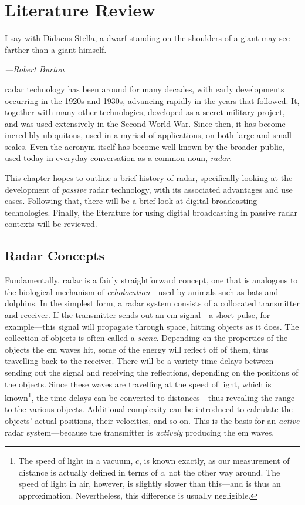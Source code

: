 \documentclass[class=report,11pt,crop=false]{standalone}
\begin{document}
\ifstandalone
\tableofcontents
\fi
\chapter{Literature Review}
\epigraph{I say with Didacus Stella, a dwarf standing on the shoulders of a giant may see farther than a giant himself.}%
    {\emph{---Robert Burton}}

\gls{radar} technology has been around for many decades, with early developments occurring in the 1920s and 1930s, advancing rapidly in the years that followed. It, together with many other technologies, developed as a secret military project, and was used extensively in the Second World War. Since then, it has become incredibly ubiquitous, used in a myriad of applications, on both large and small scales. Even the acronym itself has become well-known by the broader public, used today in everyday conversation as a common noun, \emph{radar}.

This chapter hopes to outline a brief history of radar, specifically looking at the development of \emph{passive} radar technology, with its associated advantages and use cases. Following that, there will be a brief look at digital broadcasting technologies. Finally, the literature for using digital broadcasting in passive radar contexts will be reviewed.

\section{Radar Concepts}

Fundamentally, radar is a fairly straightforward concept, one that is analogous to the biological mechanism of \emph{echolocation}---used by animals such as bats and dolphins. In the simplest form, a radar system consists of a collocated transmitter and receiver. If the transmitter sends out an \gls{em} signal---a short pulse, for example---this signal will propagate through space, hitting objects as it does. The collection of objects is often called a \emph{scene}. Depending on the properties of the objects the \gls{em} waves hit, some of the energy will reflect off of them, thus travelling back to the receiver. There will be a variety time delays between sending out the signal and receiving the reflections, depending on the positions of the objects. Since these waves are travelling at the speed of light, which is known\footnote{The speed of light in a vacuum, \(c\), is known exactly, as our measurement of distance is actually defined in terms of \(c\), not the other way around. The speed of light in air, however, is slightly slower than this---and is thus an approximation. Nevertheless, this difference is usually negligible.}, the time delays can be converted to distances---thus revealing the range to the various objects. Additional complexity can be introduced to calculate the objects' actual positions, their velocities, and so on. This is the basis for an \emph{active} radar system---because the transmitter is \emph{actively} producing the \gls{em} waves.
\end{document}
